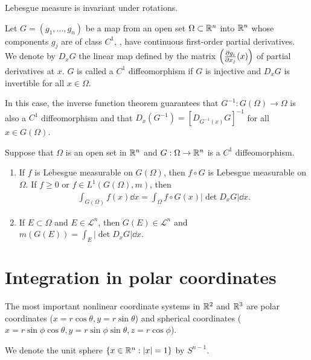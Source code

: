 \begin{corollary}
    Lebesgue measure is invariant under rotations.
\end{corollary}

\begin{definition}
    Let $G = (g_1, \dots, g_n)$ be a map from an open set $\Omega \subset \mathbb{R}^n$ into $\mathbb{R}^n$ whose components $g_j$ are of class $C^1$, \ie, have continuous first-order partial derivatives.
    We denote by $D_{x} G$ the linear map defined by the matrix $\left(\frac{\partial g_i}{\partial x_j}(x)\right)$ of partial derivatives at $x$.
    $G$ is called a $C^1$ diffeomorphism if $G$ is injective and $D_{x} G$ is invertible for all $x \in \Omega$.
\end{definition}

In this case, the inverse function theorem guarantees that $G^{-1}: G(\Omega) \to \Omega$ is also a $C^1$ diffeomorphism and that $D_{x}(G^{-1}) = [D_{G^{-1}(x)} G]^{-1}$ for all $x \in G(\Omega)$.

\begin{theorem}
    Suppose that $\Omega$ is an open set in $\mathbb{R}^n$ and $G: \Omega \to \mathbb{R}^n$ is a $C^1$ diffeomorphism.
    \begin{enumerate}
        \item If $f$ is Lebesgue measurable on $G(\Omega)$, then $f \circ G$ is Lebesgue measurable on $\Omega$. If $f \ge 0$ or $f \in L^1(G(\Omega), m)$, then
        \begin{align}
            \int _{G(\Omega)} f(x) \dd x = \int_{\Omega} f \circ G (x) |\det D_{x} G| \dd x.
        \end{align}
        \item If $E \subset \Omega$ and $E \in \mathcal{L}^n$, then $G(E) \in \mathcal{L}^n$ and $m(G(E)) = \int_{E} |\det D_{x} G| \dd x$.
    \end{enumerate}
\end{theorem}

\section{Integration in polar coordinates}

The most important nonlinear coordinate systems in $\mathbb{R}^2$ and $\mathbb{R}^3$ are polar coordinates ($x = r \cos \theta, y = r \sin \theta$) and spherical coordinates ($x = r \sin \phi \cos \theta, y = r \sin \phi \sin \theta, z = r \cos \phi$).

We denote the unit sphere $\{ x \in \mathbb{R}^n: |x| = 1 \}$ by $S^{n-1}$.

